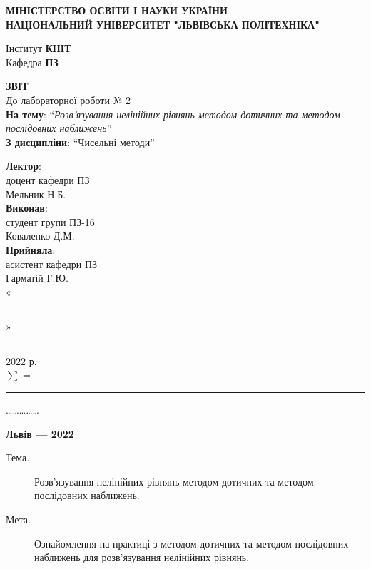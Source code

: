 \documentclass{article}
\newcommand\subject{Чисельні методи}
\newcommand\lecturer{доцент кафедри ПЗ\\Мельник Н.Б.}
\newcommand\teacher{асистент кафедри ПЗ\\Гарматій Г.Ю.}
\newcommand\mygroup{ПЗ-16}
\newcommand\lab{2}
\newcommand\theme{Розв’язування нелінійних рівнянь методом дотичних та методом послідовних наближень}
\newcommand\purpose{Ознайомлення на практиці з методом дотичних та методом
	послідовних наближень для розв’язування нелінійних рівнянь}
\begin{document}
\begin{large}
	\begin{titlepage}
		\thispagestyle{empty}
		\begin{center}
			\textbf{МІНІСТЕРСТВО ОСВІТИ І НАУКИ УКРАЇНИ\\
				НАЦІОНАЛЬНИЙ УНІВЕРСИТЕТ "ЛЬВІВСЬКА ПОЛІТЕХНІКА"}
		\end{center}
		\begin{flushright}
			Інститут \textbf{КНІТ}\\
			Кафедра \textbf{ПЗ}
		\end{flushright}
		\vspace{200pt}
		\begin{center}
			\textbf{ЗВІТ}\\
			\vspace{10pt}
			До лабораторної роботи № \lab\\
			\textbf{На тему}: “\textit{\theme}”\\
			\textbf{З дисципліни}: “\subject”
		\end{center}
		\vspace{90pt}
		\begin{flushright}
			
			\textbf{Лектор}:\\
			\lecturer\\
			\vspace{28pt}
			\textbf{Виконав}:\\
			
			студент групи \mygroup\\
			Коваленко Д.М.\\
			\vspace{28pt}
			\textbf{Прийняла}:\\
			
			\teacher\\
			
			\vspace{28pt}
			«\rule{1cm}{0.15mm}» \rule{1.5cm}{0.15mm} 2022 р.\\
			$\sum$ = \rule{1cm}{0.15mm}……………\\
			
		\end{flushright}
		\vspace{\fill}
		\begin{center}
			\textbf{Львів — 2022}
		\end{center}
	\end{titlepage}
		
	\begin{description}
		\item[Тема.] \theme.
		\item[Мета.] \purpose.
	\end{description}
	

\end{large}
\end{document}
